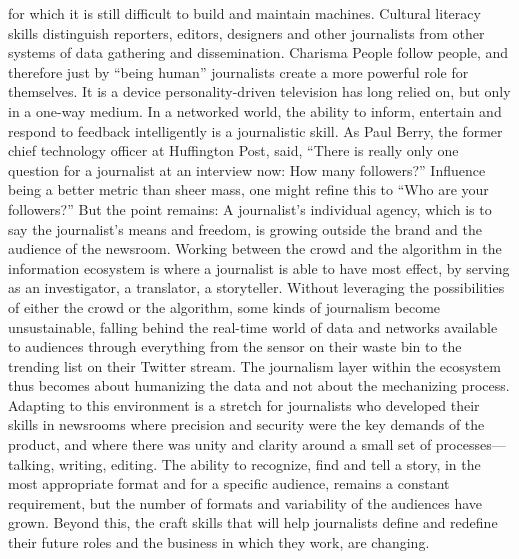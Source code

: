 for which it is still difficult to build and maintain machines. Cultural literacy skills
distinguish reporters, editors, designers and other journalists from other systems
of data gathering and dissemination.
Charisma
People follow people, and therefore just by ``being human'' journalists create a
more powerful role for themselves. It is a device personality-driven television has
long relied on, but only in a one-way medium. In a networked world, the ability
to inform, entertain and respond to feedback intelligently is a journalistic skill. As
Paul Berry, the former chief technology officer at Huffington Post, said, ``There
is really only one question for a journalist at an interview now: How many followers?''
Influence being a better metric than sheer mass, one might refine this
to ``Who are your followers?'' But the point remains: A journalist’s individual
agency, which is to say the journalist’s means and freedom, is growing outside the
brand and the audience of the newsroom.
Working between the crowd and the algorithm in the information ecosystem
is where a journalist is able to have most effect, by serving as an investigator, a
translator, a storyteller. Without leveraging the possibilities of either the crowd or
the algorithm, some kinds of journalism become unsustainable, falling behind the
real-time world of data and networks available to audiences through everything
from the sensor on their waste bin to the trending list on their Twitter stream.
The journalism layer within the ecosystem thus becomes about humanizing the
data and not about the mechanizing process.
Adapting to this environment is a stretch for journalists who developed their
skills in newsrooms where precision and security were the key demands of the
product, and where there was unity and clarity around a small set of processes—
talking, writing, editing. The ability to recognize, find and tell a story, in the most
appropriate format and for a specific audience, remains a constant requirement,
but the number of formats and variability of the audiences have grown. Beyond
this, the craft skills that will help journalists define and redefine their future roles
and the business in which they work, are changing.

